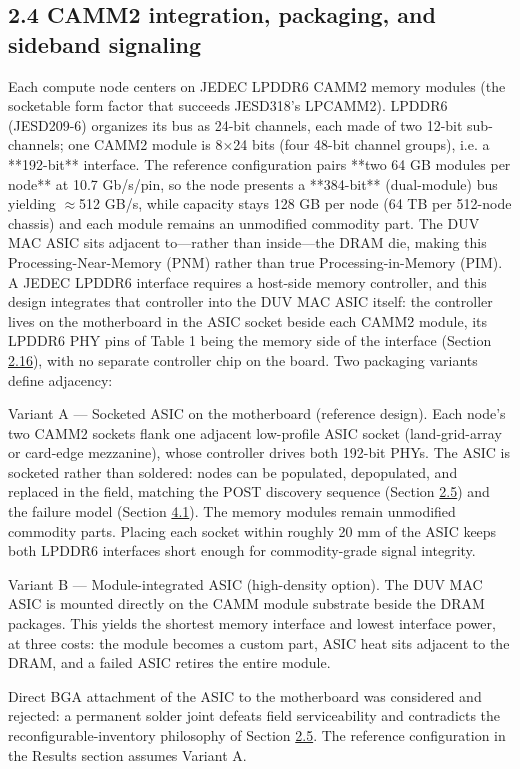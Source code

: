 \documentclass[10pt,twocolumn]{article}
\begin{document}
\subsection*{2.4 CAMM2 integration, packaging, and sideband signaling}\label{sec:2.4}

Each compute node centers on JEDEC LPDDR6 CAMM2 memory modules (the socketable form factor that succeeds JESD318's LPCAMM2)\cite{16,17}. LPDDR6 (JESD209-6) organizes its bus as 24-bit channels, each made of two 12-bit sub-channels; one CAMM2 module is 8$\times$24 bits (four 48-bit channel groups), i.e. a **192-bit** interface. The reference configuration pairs **two 64 GB modules per node** at 10.7 Gb/s/pin, so the node presents a **384-bit** (dual-module) bus yielding $\approx$512 GB/s, while capacity stays 128 GB per node (64 TB per 512-node chassis) and each module remains an unmodified commodity part. The DUV MAC ASIC sits adjacent to---rather than inside---the DRAM die, making this Processing-Near-Memory (PNM) rather than true Processing-in-Memory (PIM). A JEDEC LPDDR6 interface requires a host-side memory controller, and this design integrates that controller into the DUV MAC ASIC itself: the controller lives on the motherboard in the ASIC socket beside each CAMM2 module, its LPDDR6 PHY pins of Table 1 being the memory side of the interface (Section \hyperref[sec:2.16]{2.16}), with no separate controller chip on the board. Two packaging variants define adjacency:

Variant A --- Socketed ASIC on the motherboard (reference design). Each node's two CAMM2 sockets flank one adjacent low-profile ASIC socket (land-grid-array or card-edge mezzanine), whose controller drives both 192-bit PHYs. The ASIC is socketed rather than soldered: nodes can be populated, depopulated, and replaced in the field, matching the POST discovery sequence (Section \hyperref[sec:2.5]{2.5}) and the failure model (Section \hyperref[sec:4.1]{4.1}). The memory modules remain unmodified commodity parts. Placing each socket within roughly 20 mm of the ASIC keeps both LPDDR6 interfaces short enough for commodity-grade signal integrity.

Variant B --- Module-integrated ASIC (high-density option). The DUV MAC ASIC is mounted directly on the CAMM module substrate beside the DRAM packages. This yields the shortest memory interface and lowest interface power, at three costs: the module becomes a custom part, ASIC heat sits adjacent to the DRAM, and a failed ASIC retires the entire module.

Direct BGA attachment of the ASIC to the motherboard was considered and rejected: a permanent solder joint defeats field serviceability and contradicts the reconfigurable-inventory philosophy of Section \hyperref[sec:2.5]{2.5}. The reference configuration in the Results section assumes Variant A.
\end{document}
